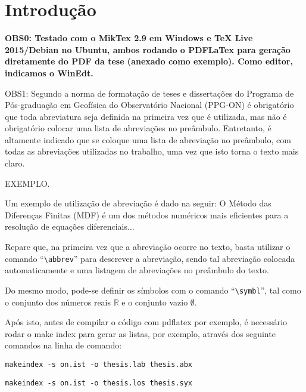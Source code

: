 \chapter{Introdução}

\textbf{OBS0: Testado com o MikTex 2.9 em Windows e TeX Live 2015/Debian no Ubuntu, ambos rodando o PDFLaTex para geração diretamente do PDF da tese (anexado como exemplo). Como editor, indicamos o WinEdt.}

OBS1: Segundo a norma de formatação de teses e disserta{\c c}\~oes do
Programa de Pós-graduação em Geofísica do Observatório Nacional (PPG-ON)
é obrigatório que toda abreviatura seja definida na primeira vez que é
utilizada, mas não é obrigatório colocar uma lista de abreviações no preâmbulo.
Entretanto, é altamente indicado que se coloque uma lista de abreviação no
preâmbulo, com todas as abreviações utilizadas no trabalho, uma vez que isto
torna o texto mais claro.

EXEMPLO.

Um exemplo de utilização de abreviação é dado na seguir: O Método das Diferenças Finitas
(MDF) é um dos métodos numéricos mais eficientes
para a resolução de equações diferenciais...

Repare que, na primeira vez que a abreviação ocorre no texto, basta utilizar o comando
``\verb|\abbrev|'' para descrever a abreviação, sendo tal abreviação colocada automaticamente
e uma listagem de abreviações no preâmbulo do texto.

Do mesmo modo, pode-se definir os símbolos com o comando ``\verb|\symbl|'', tal como o
conjunto dos números reais $\mathbb{R}$ e o conjunto vazio $\emptyset$.

Após isto, antes de compilar o código com pdflatex por exemplo, é necessário rodar o make index
para gerar as listas, por exemplo, através dos seguinte comandos na linha de comando:

\verb|makeindex -s on.ist -o thesis.lab thesis.abx|

\verb|makeindex -s on.ist -o thesis.los thesis.syx|

